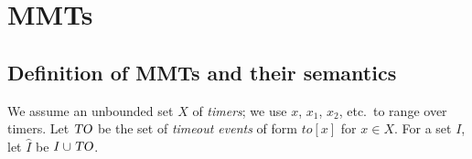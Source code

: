 \newcommand{\natplus}{\nat^{>0}}
\newcommand{\realsplus}{\bbbr^{\geq 0}}
\newcommand{\delays}{\bbbr^{> 0}}
\newcommand{\stoptimer}{\mathit{kill}}
\newcommand{\tosymbol}{\mathit{to}}
\newcommand{\toevent}[1]{\mathit{to}[#1]}
\newcommand{\toevents}{\mbox{\sl TO}}
\newcommand{\extinputs}{\hat{I}}
\newcommand{\acttimers}{\mathit{active}}
\newcommand{\Head}[1]{\mathsf{Head}({#1})}
\newcommand{\Tail}[1]{\mathsf{Tail}({#1})}
\newcommand{\Last}[1]{\mathsf{Last}({#1})}
\newcommand{\expirable}{\mathit{expirable}}
\newcommand{\tvals}{\kappa}
\newcommand{\Vals}[1]{\mathit{Val}({#1})}
\newcommand{\delay}[2]{t_{[#1:#2]}}
\newcommand{\timerof}[2]{x_{#1}^{#2}}
\newcommand{\constrof}[1]{\phi_{#1}}
\newcommand{\Post}{\mathsf{Post}}
\newcommand{\beh}{\mathit{beh}}
\newcommand{\untime}{\mathit{untime}}
\newcommand{\run}{\mathit{pullback}}
\newcommand{\timedword}{\mathit{tw}}
\newcommand{\startedby}{\mathit{startedby}}

\newcommand{\conc}{\cdot}
\newcommand{\tuple}[1]{\langle #1\rangle}
\newcommand{\set}[1]{\lbrace #1\rbrace}
\newcommand{\vect}[2]{{#1}_1 , \ldots , {#1}_{#2}}
\newcommand{\setcomp}[2]{\set{#1 ~:~ #2}}
\newcommand{\domof}[1]{\dom(#1)}
\newcommand{\ranof}[1]{\ran(#1)}
\newcommand{\vars}{\mathcal{X}}
\newcommand{\varsof}[1]{\vars(#1)}
\newcommand{\ctimers}{X}
\newcommand{\remap}{\pi}
\newcommand{\remapinst}{\rho}
\newcommand{\normalize}{\gamma}
\newcommand{\normalizeof}[2]{\normalize_{#2}^{#1}}
\newcommand{\timerbij}{\gamma}
\newcommand{\timerequiv}{\pi}
\newcommand{\extendedby}{\lhd}
\newcommand{\uttrace}{\textsf{tr}}
\newcommand{\uttraceof}[1]{\uttrace(#1)}
\newcommand{\uttracesof}[1]{\textsf{Tr}(#1)}
\newcommand{\strace}{\textsf{tr}_s}
\newcommand{\ssuffix}{v_s}
\newcommand{\suftraces}{\textsf{Tr}_s}
\newcommand{\pinpof}[1]{\textit{inp}_p(#1)}
\newcommand{\sinpof}[1]{\textit{inp}_s(#1)}
\newcommand{\symbinpof}[1]{\textit{symbinp}(#1)}
\newcommand{\word}{w}
\newcommand{\smap}{{\cal O}}
\newcommand{\smappre}{{\cal O_p}}
\newcommand{\smapsuf}{{\cal O_s}}
\newcommand{\obspre}{{\cal O_U}}

\section{MMTs}



\subsection{Definition of MMTs and their semantics}
We assume an unbounded set $X$ of {\em timers};
we use $x$, $x_1$, $x_2$, etc.\ to range over timers.
Let $\toevents$ be the set of {\em timeout events} of form
$\toevent{x}$ for $x \in X$.
For a set $I$, let $\extinputs$ be $I \cup \toevents$.

